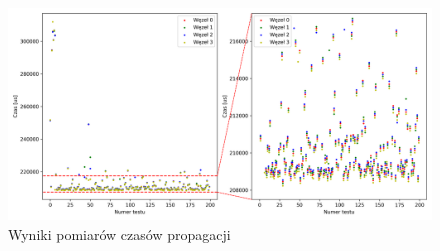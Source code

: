 \begin{figure}[H]
    \centering
    \includegraphics[width=\textwidth]{pics/ntp_sync/prop_times.png}
    \caption{Wyniki pomiarów czasów propagacji}
    \label{pic:prop_times}
\end{figure}

